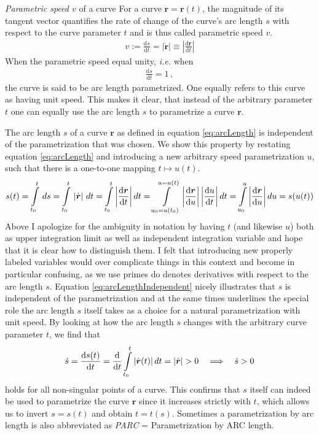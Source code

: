 \documentclass[11pt, DINA4, fleqn]{amsart}
\def\df{\mathrm{d}\xspace}
\newcommand{\dd}[2]{\frac{\df#1}{\df#2}}
\def\vr{\boldsymbol{r}\xspace}
\def\vrd{\dot{\vr}\xspace}
\begin{document}
\begin{mybox_tc3}{\emph{Parametric speed $v$} of a curve}
For a curve $\vr = \vr(t)$, the magnitude of its tangent vector 
quantifies the rate of change of the curve's arc length $s$ with respect to the curve parameter $t$ and is thus called parametric speed $v$.
\begin{align}
v := \dd{s}{t} = \left|\vrd\right| \equiv \left|\dd{\vr}{t}\right|
\label{eq:parametricSpeed}
\end{align}
When the parametric speed equal unity, \textit{i.e.} when
\begin{align}
\dd{s}{t} = 1 \, ,
\end{align}
the curve is said to be arc length parametrized. One equally refers to this curve as having unit speed.
This makes it clear, that instead of the arbitrary parameter $t$ one can equally use the arc length $s$ to parametrize a curve $\vr$.
\end{mybox_tc3}

The arc length $s$ of a curve $\vr$ as defined in equation \eqref{eq:arcLength} 
is independent of the parametrization that was chosen. We
show this property by restating equation \eqref{eq:arcLength} and introducing
a new arbitrary speed parametrization $u$, such that there is a one-to-one mapping
$t\mapsto u(t)$.
\begin{align}
s(t) = \int\displaylimits_{t_0}^{t} \, ds = \int\displaylimits_{t_0}^{t} \,
|\vrd| \,\, dt = 
\int\displaylimits_{t_0}^{t} \left|\dd{\vr}{t}\right| dt
= \int\displaylimits_{u_0 = u(t_0)}^{u=u(t)} \left|\dd{\vr}{u}\right|\left|\dd{u}{t}\right| dt
= \int\displaylimits_{u_0}^{u} \left|\dd{\vr}{u}\right| du
= s(u(t))
\label{eq:arcLengthIndependent}
\end{align}
Above I apologize for the ambiguity in notation by having $t$ (and likewise $u$) both as upper integration limit as well as independent integration variable and hope that it is clear how to distinguish them. I felt that introducing new properly labeled variables would over complicate things in this context and become in particular confusing, as we use primes do denotes derivatives with respect to the arc length $s$. 
Equation \eqref{eq:arcLengthIndependent} nicely illustrates that $s$ is independent of the parametrization and at the same times underlines the special role the arc length $s$ itself takes as a choice for a natural parametrization with unit speed.
By looking at how the arc length $s$ changes with the arbitrary curve parameter $t$, we find that
\begin{align}
\dot{s} = \dd{s(t)}{t} = \dd{}{t} \int\displaylimits_{t_0}^{t} |\vrd(t)|\,  dt = |\vrd| > 0 \quad \Longrightarrow \quad \dot{s}>0
\end{align}
holds for all non-singular points of a curve. This confirms that $s$ itself can indeed be used to parametrize the curve $\vr$ since it increases strictly with $t$, which allows us to invert $s = s(t)$ and obtain $t = t(s)$.
Sometimes a parametrization by arc length is also abbreviated as \emph{PARC} = Parametrization by ARC length.
\end{document}
